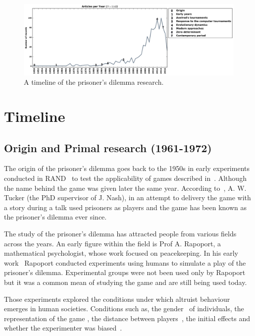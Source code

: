 \documentclass{article}
\theoremstyle{definition}
\begin{document}
\begin{figure}[!htbp]
    \centering
    \includegraphics[width=\textwidth]{assets/images/timeline.pdf}
    \caption{\label{fig:timeline} A timeline of the prisoner's dilemma research.}
\end{figure}

\section{Timeline}\label{section:timeline}

\subsection{Origin and Primal research (1961-1972)}

The origin of the prisoner's dilemma goes back to the 1950s in early experiments
conducted in RAND~\cite{Flood1958} to test the applicability of games
described in~\cite{VonNeumann1944}. Although the name behind the game was given
later the same year.
According to~\cite{Tucker1983}, A. W. Tucker (the PhD supervisor of J. Nash),
in an attempt to delivery the game with a story during a talk used prisoners as
players and the game has been known as the prisoner's dilemma ever since.

The study of the prisoner's dilemma has attracted people from various fields
across the years. An early figure within the field is Prof A. Rapoport,
a mathematical psychologist, whose work focused on peacekeeping.
In his early work~\cite{rapoport1965} Rapoport conducted experiments using humans
to simulate a play of the prisoner's dilemma. Experimental groups were not been
used only by Rapoport but it was a common mean of studying the game
\cite{Evans1966, Gallo1968, Lutzker1961, Mack1971, Sensenig1972} and are still
being used today. %

Those experiments explored the conditions under which altruist behaviour emerges
in human societies. Conditions such as, the gender~\cite{Evans1966,
Lutzker1961, Mack1971} of individuals, the representation of the game
\cite{Evans1966}, the distance between players~\cite{Sensenig1972}, the initial effects
\cite{Tedeschi1968} and whether the experimenter was biased~\cite{Gallo1968}.
\end{document}
